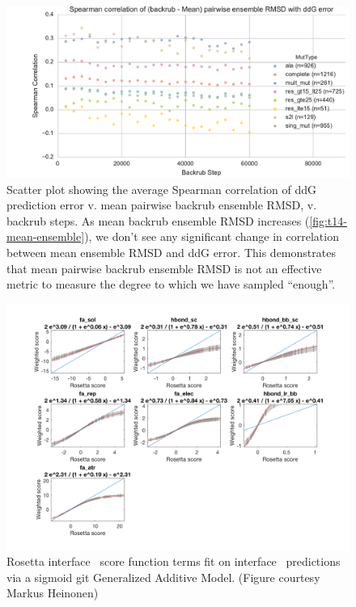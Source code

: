 \begin{figure}
  \centering
  \includegraphics[width=\textwidth,keepaspectratio]{figures/t14-spear-corr.pdf}
  \caption[\ddg\ prediction error vs. ensemble RMSD]{
    Scatter plot showing the average Spearman correlation of ddG prediction error v. mean pairwise backrub ensemble RMSD, v. backrub steps.
    As mean backrub ensemble RMSD increases (\cref{fig:t14-mean-ensemble}), we don't see any significant change in correlation between mean ensemble RMSD and ddG error.
    This demonstrates that mean pairwise backrub ensemble RMSD is not an effective metric to measure the degree to which we have sampled ``enough''.
  } \label{fig:spear-corr-rmsd-error}
\end{figure}

\begin{figure}
  \centering
  \includegraphics[width=\textwidth,keepaspectratio]{figures/zemu-sigmoid2-tal-feats.png}
  \caption[Sigmoid fit Rosetta score function terms]{
    Rosetta interface \ddg\ score function terms fit on interface \ddg\ predictions via a sigmoid git Generalized Additive Model. (Figure courtesy Markus Heinonen)
  } \label{fig:t14-fits-feats}
\end{figure}

